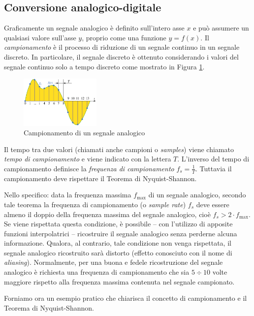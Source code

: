 \documentclass[a4paper,12pt]{report}  %
\begin{document}
\subsection{Conversione analogico-digitale}
Graficamente un segnale analogico è definito sull'intero asse $x$ e può assumere un qualsiasi valore sull'asse $y$, proprio come una funzione $y = f(x)$.
Il \textit{campionamento} è il processo di riduzione di un segnale continuo in un segnale discreto.
In particolare, il segnale discreto è ottenuto considerando i valori del segnale continuo solo a tempo discreto come mostrato in Figura \ref{fig:sampling}.

\begin{figure}[h]
    \centering
    \includegraphics[width=0.35\textwidth]{imgs/Signal_Sampling.png}
    \caption{Campionamento di un segnale analogico}
    \label{fig:sampling}
\end{figure}

Il tempo tra due valori (chiamati anche campioni o \textit{samples}) viene chiamato \textit{tempo di campionamento} e viene indicato con la lettera $T$.
L'inverso del tempo di campionamento definisce la \textit{frequenza di campionamento} $f_s = \frac{1}{T}$.
Tuttavia il campionamento deve rispettare il Teorema di Nyquist-Shannon.

Nello specifico: data la frequenza massima $f_{\text{max}}$ di un segnale analogico, secondo tale teorema la frequenza di campionamento (o \textit{sample rate}) $f_s$ deve essere almeno il doppio della frequenza massima del segnale analogico, cioè $f_s > 2 \cdot f_{\text{max}}$.
Se viene rispettata questa condizione, è possibile -- con l'utilizzo di apposite funzioni interpolatrici -- ricostruire il segnale analogico senza perderne alcuna informazione.
Qualora, al contrario, tale condizione non venga rispettata, il segnale analogico ricostruito sarà distorto (effetto conosciuto con il nome di \textit{aliasing}).
Normalmente, per una buona e fedele ricostruzione del segnale analogico è richiesta una frequenza di campionamento che sia $5 \div 10$ volte maggiore rispetto alla frequenza massima contenuta nel segnale campionato.

Forniamo ora un esempio pratico che chiarisca il concetto di campionamento e il Teorema di Nyquist-Shannon.
\end{document}
